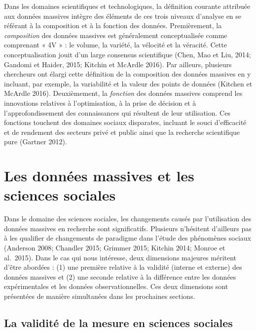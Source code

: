 \documentclass[
  letterpaper,
]{scrbook}
\begin{document}
Dans les domaines scientifiques et technologiques, la définition
courante attribuée aux données massives intègre des éléments de ces
trois niveaux d'analyse en se référant à la composition et à la fonction
des données. Premièrement, la \emph{composition} des données massives
est généralement conceptualisée comme comprenant « 4V » : le volume, la
variété, la vélocité et la véracité. Cette conceptualisation jouit d'un
large consensus scientifique (Chen, Mao et Liu, 2014; Gandomi et Haider,
2015; Kitchin et McArdle 2016). Par ailleurs, plusieurs chercheurs ont
élargi cette définition de la composition des données massives en y
incluant, par exemple, la variabilité et la valeur des points de données
(Kitchen et McArdle 2016). Deuxièmement, la \emph{fonction} des données
massives comprend les innovations relatives à l'optimisation, à la prise
de décision et à l'approfondissement des connaissances qui résultent de
leur utilisation. Ces fonctions touchent des domaines sociaux
disparates, incluant le souci d'efficacité et de rendement des secteurs
privé et public ainsi que la recherche scientifique pure (Gartner 2012).

\hypertarget{les-donnuxe9es-massives-et-les-sciences-sociales}{%
\section{Les données massives et les sciences
sociales}\label{les-donnuxe9es-massives-et-les-sciences-sociales}}

Dans le domaine des sciences sociales, les changements causés par
l'utilisation des données massives en recherche sont significatifs.
Plusieurs n'hésitent d'ailleurs pas à les qualifier de changements de
paradigme dans l'étude des phénomènes sociaux (Anderson 2008; Chandler
2015; Grimmer 2015; Kitchin 2014; Monroe et al.~2015). Dans le cas qui
nous intéresse, deux dimensions majeures méritent d'être abordées : (1)
une première relative à la validité (interne et externe) des données
massives et (2) une seconde relative à la différence entre les données
expérimentales et les données observationnelles. Ces deux dimensions
sont présentées de manière simultanées dans les prochaines sections.

\hypertarget{la-validituxe9-de-la-mesure-en-sciences-sociales}{%
\subsection{La validité de la mesure en sciences
sociales}\label{la-validituxe9-de-la-mesure-en-sciences-sociales}}
\end{document}

